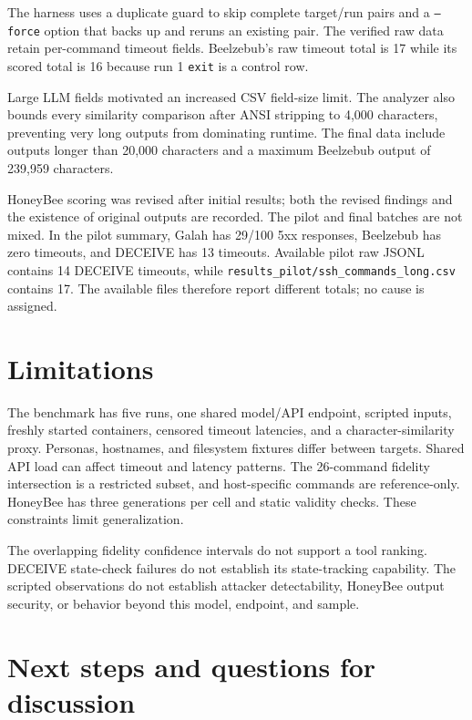 \documentclass[a4paper,11pt]{article}
\begin{document}
The harness uses a duplicate guard to skip complete target/run pairs and a
\texttt{--force} option that backs up and reruns an existing pair. The verified
raw data retain per-command timeout fields. Beelzebub's raw timeout total is
17 while its scored total is 16 because run 1 \texttt{exit} is a control row.

Large LLM fields motivated an increased CSV field-size limit. The analyzer
also bounds every similarity comparison after ANSI stripping to 4,000
characters, preventing very long outputs from dominating runtime. The final
data include outputs longer than 20,000 characters and a maximum Beelzebub
output of 239,959 characters.

HoneyBee scoring was revised after initial results; both the revised findings
and the existence of original outputs are recorded. The pilot and final
batches are not mixed. In the pilot summary, Galah has 29/100 5xx responses,
Beelzebub has zero timeouts, and DECEIVE has 13 timeouts. Available pilot raw
JSONL contains 14 DECEIVE timeouts, while
\texttt{results\_pilot/ssh\_commands\_long.csv} contains 17. The available
files therefore report different totals; no cause is assigned.

\section{Limitations}

The benchmark has five runs, one shared model/API endpoint, scripted inputs,
freshly started containers, censored timeout latencies, and a
character-similarity proxy. Personas, hostnames, and filesystem fixtures
differ between targets. Shared API load can affect timeout and latency
patterns. The 26-command fidelity intersection is a restricted subset, and
host-specific commands are reference-only. HoneyBee has three generations per
cell and static validity checks. These constraints limit generalization.

The overlapping fidelity confidence intervals do not support a tool ranking.
DECEIVE state-check failures do not establish its state-tracking capability.
The scripted observations do not establish attacker detectability, HoneyBee
output security, or behavior beyond this model, endpoint, and sample.

\section{Next steps and questions for discussion}
\end{document}
